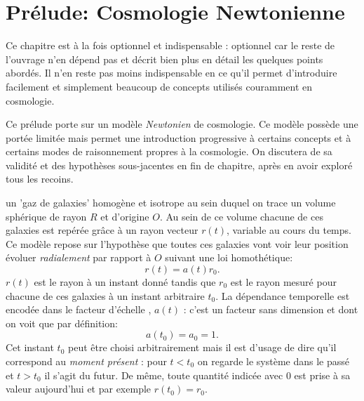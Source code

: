 \chapter{Prélude: Cosmologie Newtonienne}

Ce chapitre est à la fois optionnel et indispensable : optionnel car le reste de l'ouvrage n'en dépend pas et décrit bien plus en détail les quelques points abordés. Il n'en reste pas moins indispensable en ce qu'il permet d'introduire facilement et simplement beaucoup de concepts utilisés couramment en cosmologie.

Ce prélude porte sur un modèle \textit{Newtonien} de cosmologie. Ce modèle possède une portée limitée mais permet une introduction progressive à certains concepts et à certains modes de raisonnement propres à la cosmologie. On discutera de sa validité et des hypothèses sous-jacentes en fin de chapitre, après en avoir exploré tous les recoins.

 un 'gaz de galaxies' homogène et isotrope au sein duquel on trace un volume sphérique de rayon $R$ et d'origine $O$. Au sein de ce volume chacune de ces galaxies est repérée grâce à un rayon vecteur $r(t)$, variable au cours du temps. Ce modèle repose sur l'hypothèse que toutes ces galaxies vont voir leur position évoluer \textit{radialement} par rapport à $O$ suivant une loi homothétique:
\begin{equation}
r(t)=a(t)r_0.
\end{equation}
$r(t)$ est le rayon à un instant donné tandis que $r_0$ est le rayon mesuré pour chacune de ces galaxies à un instant arbitraire $t_0$. La dépendance temporelle est encodée dans le facteur d'échelle , $a(t)$ : c'est un facteur sans dimension et dont on voit que par définition:
\begin{equation}
a(t_0)=a_0=1.
\end{equation}
Cet instant $t_0$ peut être choisi arbitrairement mais il est d'usage de dire qu'il correspond au \textit{moment présent} : pour $t<t_0$ on regarde le système dans le passé et $t>t_0$ il s'agit du futur. De même, toute quantité indicée avec $0$ est prise à sa valeur aujourd'hui et par exemple $r(t_0)=r_0$.

